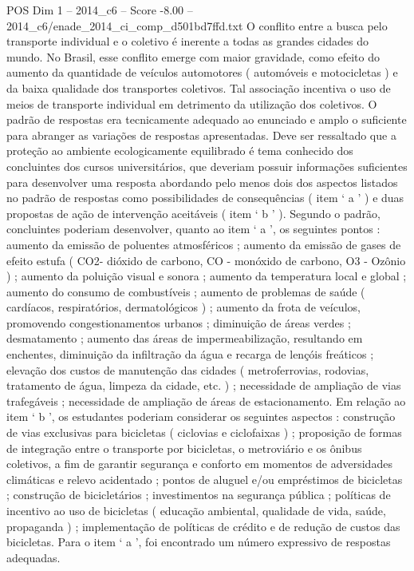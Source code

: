 \begin{textsample}{POS Dim 1 – 2014\_c6 – Score -8.00 – 2014\_c6/enade\_2014\_ci\_comp\_d501bd7ffd.txt}
O conflito entre a busca pelo transporte individual e o coletivo é inerente a todas as grandes cidades do mundo.
No Brasil, esse conflito emerge com maior gravidade, como efeito do aumento da quantidade de veículos automotores ( automóveis e motocicletas ) e da baixa qualidade dos transportes coletivos.
Tal associação incentiva o uso de meios de transporte individual em detrimento da utilização dos coletivos.
O padrão de respostas era tecnicamente adequado ao enunciado e amplo o suficiente para abranger as variações de respostas apresentadas.
Deve ser ressaltado que a proteção ao ambiente ecologicamente equilibrado é tema conhecido dos concluintes dos cursos universitários, que deveriam possuir informações suficientes para desenvolver uma resposta abordando pelo menos dois dos aspectos listados no padrão de respostas como possibilidades de consequências ( item ‘ a ’ ) e duas propostas de ação de intervenção aceitáveis ( item ‘ b ’ ).
Segundo o padrão, concluintes poderiam desenvolver, quanto ao item ‘ a ’, os seguintes pontos : aumento da emissão de poluentes atmosféricos ; aumento da emissão de gases de efeito estufa ( CO2- dióxido de carbono, CO - monóxido de carbono, O3 - Ozônio ) ; aumento da poluição visual e sonora ; aumento da temperatura local e global ; aumento do consumo de combustíveis ; aumento de problemas de saúde ( cardíacos, respiratórios, dermatológicos ) ; aumento da frota de veículos, promovendo congestionamentos urbanos ; diminuição de áreas verdes ; desmatamento ; aumento das áreas de impermeabilização, resultando em enchentes, diminuição da infiltração da água e recarga de lençóis freáticos ; elevação dos custos de manutenção das cidades ( metroferrovias, rodovias, tratamento de água, limpeza da cidade, etc. ) ; necessidade de ampliação de vias trafegáveis ; necessidade de ampliação de áreas de estacionamento.
Em relação ao item ‘ b ’, os estudantes poderiam considerar os seguintes aspectos : construção de vias exclusivas para bicicletas ( ciclovias e ciclofaixas ) ; proposição de formas de integração entre o transporte por bicicletas, o metroviário e os ônibus coletivos, a fim de garantir segurança e conforto em momentos de adversidades climáticas e relevo acidentado ; pontos de aluguel e/ou empréstimos de bicicletas ; construção de bicicletários ; investimentos na segurança pública ; políticas de incentivo ao uso de bicicletas ( educação ambiental, qualidade de vida, saúde, propaganda ) ; implementação de políticas de crédito e de redução de custos das bicicletas.
Para o item ‘ a ’, foi encontrado um número expressivo de respostas adequadas.

\end{textsample}
